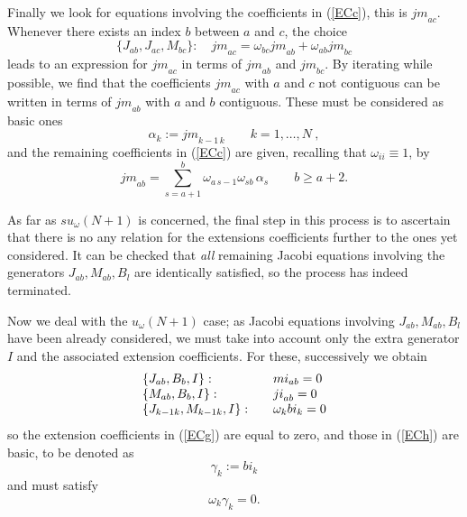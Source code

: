 \documentclass[12pt]{article}
\begin{document}
Finally we look for equations involving the coefficients in
(\ref{ECc}), this is ${jm}_{ac}$. Whenever there exists an index
$b$ between $a$ and $c$, the choice
\begin{equation}
\{{J}_{ab},{J}_{ac},{M}_{bc}\}:\quad
{jm}_{ac}={\omega}_{bc}{jm}_{ab}+{\omega}_{ab}{jm}_{bc}
\label{cp}
\end{equation}
leads to an expression for ${jm}_{ac}$ in terms of ${jm}_{ab}$ and
${jm}_{bc}$. By iterating while possible, we find that the
coefficients   ${jm}_{ac}$ with $a$ and $c$ not contiguous can be
written in terms of ${jm}_{ab}$ with $a$ and $b$ contiguous. These
must be considered as basic ones
\begin{equation}
{\alpha}_{k}:= {jm}_{k-1\,k}\qquad k=1,\dots,N \ ,
\label{cq}
\end{equation}
and the remaining coefficients in (\ref{ECc}) are given, recalling that
${\omega}_{ii}\equiv 1$, by
\begin{equation}
{jm}_{ab}=\sum_{s=a+1}^b{\omega}_{a\,s-1}{\omega}_{sb}\,{\alpha}_{s}
\qquad b\ge a+2.
\end{equation}

As far as $su_{\omega}(N+1)$ is concerned, the final step in this
process is to ascertain that there is no  any relation for the
extensions coefficients further to the ones yet considered. It can
be checked that \emph{all} remaining Jacobi equations
involving the generators ${J}_{ab}, {M}_{ab}, {B}_l$ are
identically satisfied, so the process has indeed terminated.

Now we deal with the $u_{\omega}(N+1)$ case; as Jacobi equations
involving ${J}_{ab}, {M}_{ab}, {B}_l$ have been already considered,
we must take into account only the extra generator ${I}$ and the
associated extension coefficients. For these, successively we obtain
\begin{equation}
\begin{array}{lll}
\{{J}_{ab},{B}_b,{I} \}:& \quad {mi}_{ab}=0 \cr
\{{M}_{ab},{B}_b,{I} \}:& \quad {ji}_{ab}=0 \cr
\{{J}_{k-1 k},{M}_{k-1 k},{I} \}: & \quad {\omega}_{k} {bi}_{k}=0 \cr
\end{array}
\label{cpp}
\end{equation}
so the extension coefficients in (\ref{ECg}) are equal to zero,  and those in
(\ref{ECh}) are basic, to be denoted as
\begin{equation}
{\gamma}_k:= {bi}_k
\end{equation}
and must satisfy
\begin{equation}
{\omega}_k {\gamma}_{k}=0.
\label{cextg.rel}
\end{equation}
\end{document}
